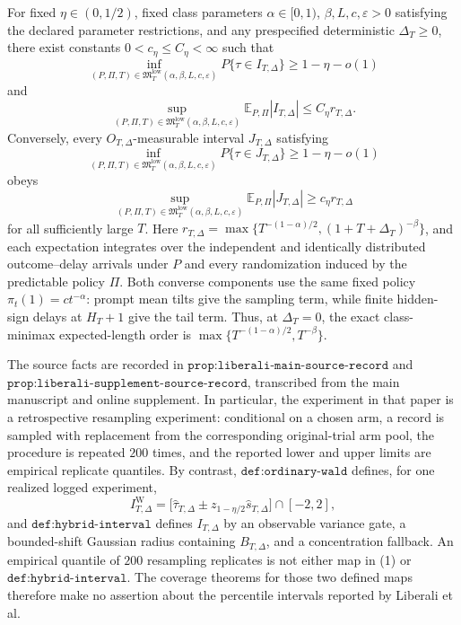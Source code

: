 For fixed \(\eta\in(0,1/2)\), fixed class parameters \(\alpha\in[0,1)\), \(\beta,L,c,\varepsilon>0\) satisfying the declared parameter restrictions, and any prespecified deterministic \(\Delta_T\geq0\), there exist constants \(0<c_\eta\leq C_\eta<\infty\) such that
\[
 \inf_{(P,\Pi,T)\in\mathfrak M_T^{\mathrm{low}}(\alpha,\beta,L,c,\varepsilon)}
 P\{\tau\in I_{T,\Delta}\}\geq1-\eta-o(1)
\]
and
\[
 \sup_{(P,\Pi,T)\in\mathfrak M_T^{\mathrm{low}}(\alpha,\beta,L,c,\varepsilon)}
 \mathbb E_{P,\Pi}|I_{T,\Delta}|\leq C_\eta r_{T,\Delta}.
\]
Conversely, every \(O_{T,\Delta}\)-measurable interval \(J_{T,\Delta}\) satisfying
\[
 \inf_{(P,\Pi,T)\in\mathfrak M_T^{\mathrm{low}}(\alpha,\beta,L,c,\varepsilon)}
 P\{\tau\in J_{T,\Delta}\}\geq1-\eta-o(1)
\]
obeys
\[
 \sup_{(P,\Pi,T)\in\mathfrak M_T^{\mathrm{low}}(\alpha,\beta,L,c,\varepsilon)}
 \mathbb E_{P,\Pi}|J_{T,\Delta}|\geq c_\eta r_{T,\Delta}
\]
for all sufficiently large \(T\). Here \(r_{T,\Delta}=\max\{T^{-(1-\alpha)/2},(1+T+\Delta_T)^{-\beta}\}\), and each expectation integrates over the independent and identically distributed outcome--delay arrivals under \(P\) and every randomization induced by the predictable policy \(\Pi\). Both converse components use the same fixed policy \(\pi_t(1)=ct^{-\alpha}\): prompt mean tilts give the sampling term, while finite hidden-sign delays at \(H_T+1\) give the tail term. Thus, at \(\Delta_T=0\), the exact class-minimax expected-length order is \(\max\{T^{-(1-\alpha)/2},T^{-\beta}\}\).

The source facts are recorded in \(\texttt{prop:liberali-main-source-record}\) and \(\texttt{prop:liberali-supplement-source-record}\), transcribed from the main manuscript and online supplement.  In particular, the experiment in that paper is a retrospective resampling experiment: conditional on a chosen arm, a record is sampled with replacement from the corresponding original-trial arm pool, the procedure is repeated \(200\) times, and the reported lower and upper limits are empirical replicate quantiles.  By contrast, \(\texttt{def:ordinary-wald}\) defines, for one realized logged experiment,
\[
 I_{T,\Delta}^{\mathrm W}
 =\bigl[\widehat\tau_{T,\Delta}
 \mathbin{\pm}z_{1-\eta/2}\widehat s_{T,\Delta}\bigr]\cap[-2,2],
 \tag{1}
\]
and \(\texttt{def:hybrid-interval}\) defines \(I_{T,\Delta}\) by an observable variance gate, a bounded-shift Gaussian radius containing \(B_{T,\Delta}\), and a concentration fallback.  An empirical quantile of \(200\) resampling replicates is not either map in (1) or \(\texttt{def:hybrid-interval}\).  The coverage theorems for those two defined maps therefore make no assertion about the percentile intervals reported by Liberali et al.


